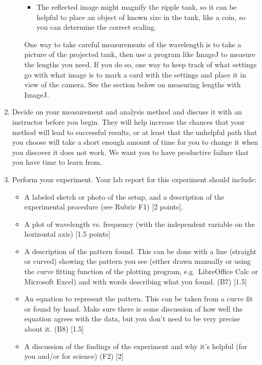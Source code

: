 \begin{enumerate}
\begin{itemize}
\begin{itemize}
			\item The reflected image might magnify the ripple tank, so it can be helpful to place an object of known size in the tank, like a coin, so you can determine the correct scaling.
		\end{itemize}
		
		One way to take careful measurements of the wavelength is to take a picture of the projected tank, then use a program like ImageJ to measure the lengths you need. If you do so, one way to keep track of what settings go with what image is to mark a card with the settings and place it in view of the camera. See the section below on measuring lengths with ImageJ.
	\end{itemize}

	\item Decide on your measurement and analysis method and discuss it with an instructor before you begin. They will help increase the chances that your method will lead to successful results, or at least that the unhelpful path that you choose will take a short enough amount of time for you to change it when you discover it does not work. We want you to have productive failure that you have time to learn from.
	
	\item Perform your experiment. Your lab report for this experiment should include:
	\begin{itemize}
		\item A labeled sketch or photo of the setup, and a description of the experimental procedure (see Rubric F1) [2 points].
		
		\item A plot of wavelength vs. frequency (with the independent variable on the horizontal axis) [1.5 points]
		
		\item A description of the pattern found. This can be done with a line (straight or curved) showing the pattern you see (either drawn manually or using the curve fitting function of the plotting program, e.g.\ LibreOffice Calc or Microsoft Excel) and with words describing what you found. (B7) [1.5]
		
		\item An equation to represent the pattern. This can be taken from a curve fit or found by hand. Make sure there is some discussion of how well the equation agrees with the data, but you don't need to be very precise about it. (B8) [1.5]
		
		\item A discussion of the findings of the experiment and why it's helpful (for you and/or for science) (F2) [2]
	\end{itemize}

\end{enumerate}

